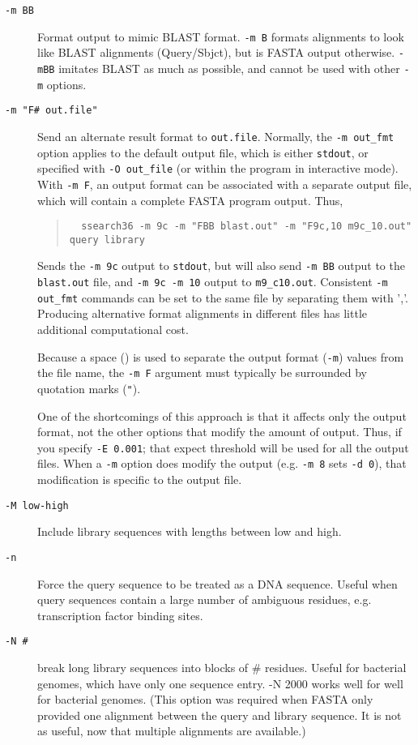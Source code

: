 \documentclass[11pt]{article}
\begin{document}
\begin{description}
\item[\texttt{-m BB}] Format output to mimic BLAST format.  \texttt{-m
  B} formats alignments to look like BLAST alignments (Query/Sbjct),
  but is FASTA output otherwise. \texttt{-mBB} imitates BLAST as much
  as possible, and cannot be used with other \texttt{-m} options.

\item[\texttt{-m "F\# out.file"}] Send an alternate result format to \texttt{out.file}.
Normally, the \texttt{-m out\_fmt} option applies to the default output
file, which is either \texttt{stdout}, or specified with \texttt{-O out\_file} (or within
the program in interactive mode). With \texttt{-m F}, an output format can be
associated with a separate output file, which will contain a complete
FASTA program output.  Thus,
\begin{quote}
\begin{small}
\begin{verbatim}
  ssearch36 -m 9c -m "FBB blast.out" -m "F9c,10 m9c_10.out" query library
\end{verbatim}
\end{small}
\end{quote}
Sends the \texttt{-m 9c} output to \texttt{stdout}, but will also send
\texttt{-m BB} output to the \texttt{blast.out} file, and \texttt{-m 9c -m
  10} output to \texttt{m9\_c10.out}.  Consistent \texttt{-m out\_fmt}
commands can be set to the same file by separating them with ','.
Producing alternative format alignments in different files has little
additional computational cost.

Because a space (\textvisiblespace) is used to separate the output
format (\texttt{-m}) values from the file name, the \texttt{-m F}
argument must typically be surrounded by quotation marks (\texttt{"}).

One of the shortcomings of this approach is that it affects only the
output format, not the other options that modify the amount of output.
Thus, if you specify \texttt{-E 0.001}; that expect threshold will be
used for all the output files.  When a \texttt{-m} option does modify
the output (e.g. \texttt{-m 8} sets \texttt{-d 0}), that modification
is specific to the output file.

\item[\texttt{-M low-high}]
Include library sequences with lengths between low and
high.
\item[\texttt{-n}]
Force the query sequence to be treated as a DNA sequence.  
Useful when query sequences contain a large number of
ambiguous residues, e.g. transcription factor binding sites.
\item[\texttt{-N \#}]
break long library sequences into blocks of \# residues.  Useful for
bacterial genomes, which have only one sequence entry.  -N 2000 works
well for well for bacterial genomes. (This option was required when
FASTA only provided one alignment between the query and library
sequence.  It is not as useful, now that multiple alignments are
available.)


\end{description}
\end{document}

